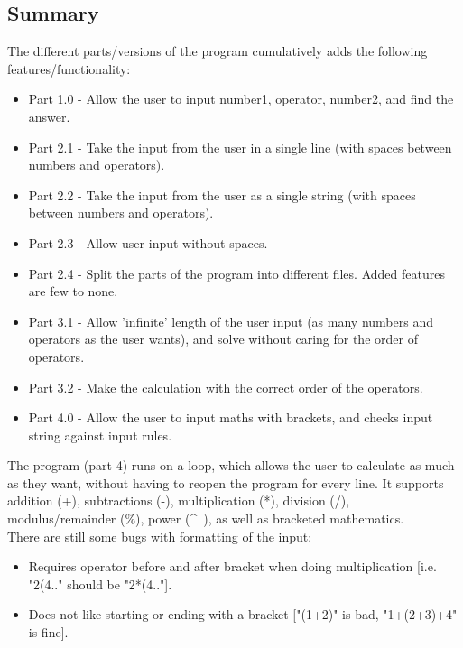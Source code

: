 \documentclass{article}
\begin{document}
		
		\subsection{Summary}
			The different parts/versions of the program cumulatively adds the following features/functionality:
			\begin{itemize}
				\item Part 1.0	- Allow the user to input number1, operator, number2, and find the answer.
				\item Part 2.1	- Take the input from the user in a single line (with spaces between numbers and operators).
				\item Part 2.2	- Take the input from the user as a single string (with spaces between numbers and operators).
				\item Part 2.3	- Allow user input without spaces.
				\item Part 2.4	- Split the parts of the program into different files. Added features are few to none.
				\item Part 3.1	- Allow 'infinite' length of the user input (as many numbers and operators as the user wants), and solve without caring for the order of operators.
				\item Part 3.2	- Make the calculation with the correct order of the operators.
				\item Part 4.0	- Allow the user to input maths with brackets, and checks input string against input rules.
			\end{itemize}
	
			The program (part 4) runs on a loop, which allows the user to calculate as much as they want, without having to reopen the program for every line.
			It supports addition (+), subtractions (-), multiplication (*), division (/), modulus/remainder (\%), power (\^~), as well as bracketed mathematics. \\
			There are still some bugs with formatting of the input:
			\begin{itemize}
				\item Requires operator before and after bracket when doing multiplication [i.e. "2(4.." should be "2*(4.."].
				\item Does not like starting or ending with a bracket ["(1+2)" is bad, "1+(2+3)+4" is fine].
			\end{itemize}
	
\end{document}

